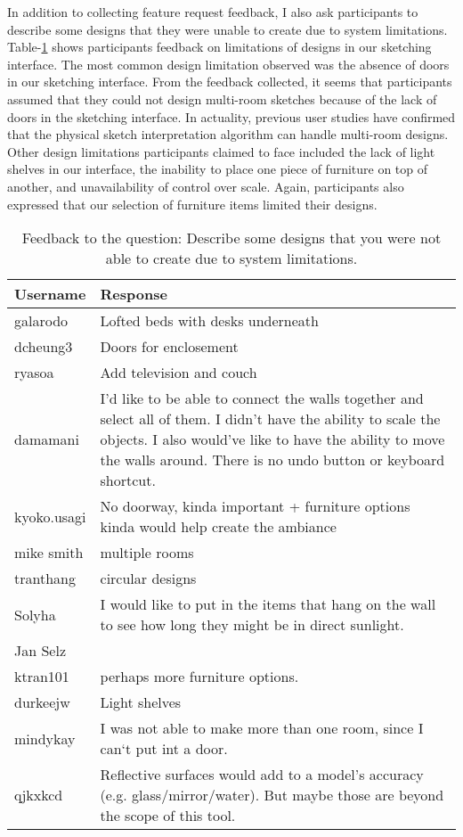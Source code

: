 In addition to collecting feature request feedback, I also ask participants to describe some designs that they were unable to create due to system limitations.  Table-\ref{fig:limitation} shows participants feedback on limitations of designs in our sketching interface.  The most common design limitation observed was the absence of doors in our sketching interface.  From the feedback collected, it seems that participants assumed that they could not design multi-room sketches because of the lack of doors in the sketching interface.  In actuality, previous user studies have confirmed that the physical sketch interpretation algorithm can handle multi-room designs.  Other design limitations participants claimed to face included the lack of light shelves in our interface, the inability to place one piece of furniture on top of another, and unavailability of control over scale.  Again, participants also expressed that our selection of furniture items limited their designs. \\ 

\begin{table}[!ht]
\centering
\caption[Describe some designs that you were not able to create due  to system limitations.]{Feedback to the question: Describe some designs that you were not able to create due  to system limitations. }
\label{fig:limitation}
\begin{tabular}{|p{}|p{}|}
\hline
\rowcolor[HTML]{EFEFEF} 
\textbf{Username} & \textbf{Response} \\ \hline
galarodo & Lofted beds with desks underneath \\ \hline
dcheung3 & Doors for enclosement \\ \hline
ryasoa & Add television and couch \\ \hline
damamani & I'd like to be able to connect the walls together and select all of them. I didn't have the ability to scale the objects.  I also would've like to have the ability to move the walls around. There is no undo button or keyboard shortcut. \\ \hline
kyoko.usagi & No doorway, kinda important + furniture options kinda would help create the ambiance \\ \hline
mike smith & multiple rooms \\ \hline
tranthang & circular designs \\ \hline
Solyha & I would like to put in the items that hang on the wall to see how long they might be in direct sunlight. \\ \hline
Jan Selz &  \\ \hline
ktran101 & perhaps more furniture options. \\ \hline
durkeejw & Light shelves \\ \hline
mindykay & I was not able to make more than one room, since I can`t put int a door. \\ \hline
qjkxkcd & Reflective surfaces would add to a model's accuracy (e.g. glass/mirror/water). But maybe those are beyond the scope of this tool. \\ \hline
\end{tabular}
\end{table}


